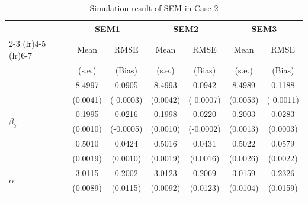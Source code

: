 \documentclass[11pt]{article}
\begin{document}
{\begin{table}[h!]
\footnotesize
\centering
        \begin{tabular}{lcccccc}
        \toprule
        & \multicolumn{2}{c}{SEM1} & \multicolumn{2}{c}{SEM2} & \multicolumn{2}{c}{SEM3} \\
        \cmidrule(lr){2-3} \cmidrule(lr){4-5} \cmidrule(lr){6-7}
        & Mean & RMSE & Mean & RMSE & Mean & RMSE \\
        & (s.e.) & (Bias) & (s.e.) & (Bias) & (s.e.) & (Bias) \\
        \midrule
        \multirow{6}{*}{$\beta_Y$} & 8.4997 & 0.0905 & 8.4993 & 0.0942 & 8.4989 & 0.1188 \\
         & (0.0041) & (-0.0003) & (0.0042) & (-0.0007) & (0.0053) & (-0.0011) \\
        \cmidrule{2-7}
         & 0.1995 & 0.0216 & 0.1998 & 0.0220 & 0.2003 & 0.0283 \\
         & (0.0010) & (-0.0005) & (0.0010) & (-0.0002) & (0.0013) & (0.0003) \\
        \cmidrule{2-7}
         & 0.5010 & 0.0424 & 0.5016 & 0.0431 & 0.5022 & 0.0579 \\
         & (0.0019) & (0.0010) & (0.0019) & (0.0016) & (0.0026) & (0.0022) \\
        \midrule
        \multirow{2}{*}{$\alpha$} & 3.0115 & 0.2002 & 3.0123 & 0.2069 & 3.0159 & 0.2326 \\
         & (0.0089) & (0.0115) & (0.0092) & (0.0123) & (0.0104) & (0.0159) \\
        \hhline{=======}
        \end{tabular}
\caption{Simulation result of SEM in Case 2}\label{tab:AppSimExoCase2}
\end{table}

}
\end{document}
